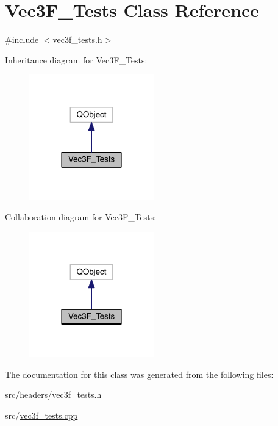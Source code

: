 \hypertarget{class_vec3_f___tests}{\section{Vec3\+F\+\_\+\+Tests Class Reference}
\label{class_vec3_f___tests}
}


{\ttfamily \#include $<$vec3f\+\_\+tests.\+h$>$}



Inheritance diagram for Vec3\+F\+\_\+\+Tests\+:\nopagebreak
\begin{figure}[H]
\begin{center}
\leavevmode
\includegraphics[width=153pt]{class_vec3_f___tests__inherit__graph}
\end{center}
\end{figure}


Collaboration diagram for Vec3\+F\+\_\+\+Tests\+:\nopagebreak
\begin{figure}[H]
\begin{center}
\leavevmode
\includegraphics[width=153pt]{class_vec3_f___tests__coll__graph}
\end{center}
\end{figure}


The documentation for this class was generated from the following files\+:\begin{DoxyCompactItemize}
\item 
src/headers/\hyperlink{vec3f__tests_8h}{vec3f\+\_\+tests.\+h}\item 
src/\hyperlink{vec3f__tests_8cpp}{vec3f\+\_\+tests.\+cpp}\end{DoxyCompactItemize}

